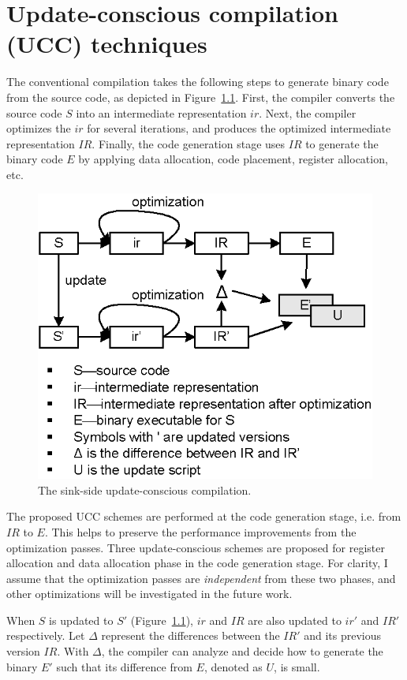 \chapter{ Update-conscious compilation (UCC) techniques}

The conventional compilation takes the following steps to generate binary code from the source code, as depicted in
Figure~\ref{fover.sink}. First, the compiler converts the source code $S$ into an intermediate representation $ir$. Next, the compiler optimizes the $ir$ for several iterations, and produces the optimized intermediate representation $IR$. Finally, the code generation stage uses $IR$ to generate the binary code $E$ by applying data allocation, code placement, register allocation, etc.
\begin{figure}[htp]
\centering
\includegraphics[scale=1]{figures/com_sink.eps}
\caption{The sink-side update-conscious compilation.}
\label{fover.sink}
\end{figure}

The proposed UCC schemes are performed at the code generation stage, i.e. from $IR$ to $E$. This helps to preserve the performance improvements from the optimization passes. 
Three update-conscious schemes are proposed for register allocation and data allocation phase in the code generation stage. For clarity, I assume that the optimization passes are {\it independent} from these two phases, and other optimizations will be investigated in the future work.

When $S$ is updated to $S'$ (Figure~\ref{fover.sink}), $ir$ and $IR$ are also updated to $ir'$ and $IR'$ respectively. Let $\Delta$ represent the differences between the $IR'$ and its previous version $IR$. With $\Delta$, the compiler can analyze and decide how to generate the binary $E'$ such that its difference from $E$, denoted as $U$, is small.

